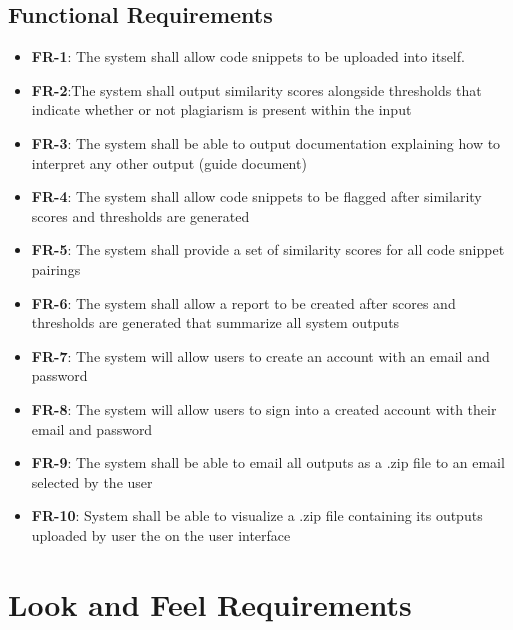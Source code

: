 \documentclass[12pt]{article}
\begin{document}
\subsection{Functional Requirements}
\begin{itemize}
    \item \textbf{FR-1}: The system shall allow code snippets to be
    uploaded into itself.
    \item \textbf{FR-2}:The system shall output similarity scores alongside 
    thresholds that indicate whether or not plagiarism is present within the input
    \item \textbf{FR-3}: The system shall be able to output documentation explaining
    how to interpret any other output (guide document)
    \item \textbf{FR-4}: The system shall allow code snippets to be flagged after similarity
    scores and thresholds are generated
    \item \textbf{FR-5}: The system shall provide a set of similarity scores for all code 
    snippet pairings
    \item \textbf{FR-6}: The system shall allow a report to be created after scores and 
    thresholds are generated that summarize all system outputs 
    \item \textbf{FR-7}: The system will allow users to create an account with an email and password
    \item \textbf{FR-8}: The system will allow users to sign into a created account with 
    their email and password
    \item \textbf{FR-9}: The system shall be able to email all outputs as a .zip file 
    to an email selected by the user
    \item \textbf{FR-10}: System shall be able to visualize a .zip file containing its outputs
    uploaded by user the on the user interface
\end{itemize}

\section{Look and Feel Requirements}
\end{document}
